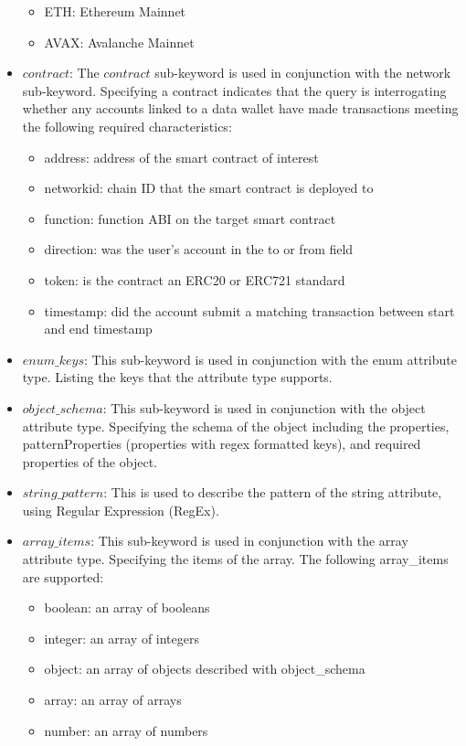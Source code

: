 \begin{itemize}
\begin{itemize}
        \item ETH: Ethereum Mainnet
        \item AVAX: Avalanche Mainnet
    \end{itemize}
    \item $contract$: The $contract$ sub-keyword is used in conjunction with the network sub-keyword. Specifying a contract indicates that the query is interrogating whether any accounts linked to a data wallet have made transactions meeting the following required characteristics:
    \begin{itemize}
        \item address: address of the smart contract of interest
        \item networkid: chain ID that the smart contract is deployed to
        \item function: function ABI on the target smart contract
        \item direction: was the user's account in the to or from field
        \item token: is the contract an ERC20 or ERC721 standard
        \item timestamp: did the account submit a matching transaction between start and end timestamp
    \end{itemize}
    \item $enum\_keys$: This sub-keyword is used in conjunction with the enum attribute type. Listing the keys that the attribute type supports.
    \item $object\_schema$: This sub-keyword is used in conjunction with the object attribute type. Specifying the schema of the object including the properties, patternProperties (properties with regex formatted keys), and required properties of the object.
    \item $string\_pattern$: This is used to describe the pattern of the string attribute, using Regular Expression (RegEx).
    \item $array\_items$: This sub-keyword is used in conjunction with the array attribute type. Specifying the items of the array. The following array\_items are supported:
    \begin{itemize}
        \item boolean: an array of booleans
        \item integer: an array of integers
        \item object: an array of objects described with object\_schema
        \item array: an array of arrays
        \item number: an array of numbers
    \end{itemize}
\end{itemize}

